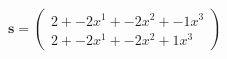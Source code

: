 \documentclass[preview]{standalone}
\begin{document}
\begin{align*}
\mathbf{s} = \begin{pmatrix}2 + -2x^{1} + -2x^{2} + -1x^{3} \\ 2 + -2x^{1} + -2x^{2} + 1x^{3}\end{pmatrix}
\end{align*}
\end{document}
